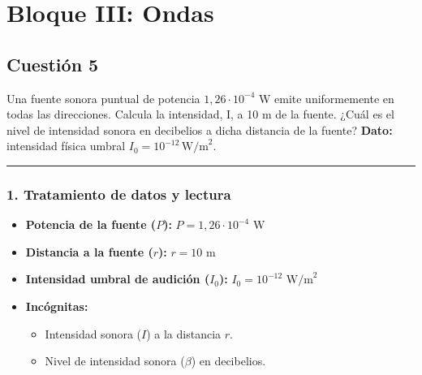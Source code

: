 \newpage

\section{Bloque III: Ondas}
\label{sec:ondas_2022_jun_ord}

\subsection{Cuestión 5}
\label{subsec:C5_2022_jun_ord}

\begin{cajaenunciado}
Una fuente sonora puntual de potencia $1,26 \cdot 10^{-4}$ W emite uniformemente en todas las direcciones. Calcula la intensidad, I, a 10 m de la fuente. ¿Cuál es el nivel de intensidad sonora en decibelios a dicha distancia de la fuente?
\textbf{Dato:} intensidad física umbral $I_0 = 10^{-12} \, \text{W/m}^2$. 
\end{cajaenunciado}
\hrule

\subsubsection*{1. Tratamiento de datos y lectura}
\begin{itemize}
    \item \textbf{Potencia de la fuente ($P$):} $P = 1,26 \cdot 10^{-4} \text{ W}$
    \item \textbf{Distancia a la fuente ($r$):} $r = 10 \text{ m}$
    \item \textbf{Intensidad umbral de audición ($I_0$):} $I_0 = 10^{-12} \text{ W/m}^2$
    \item \textbf{Incógnitas:}
        \begin{itemize}
            \item Intensidad sonora ($I$) a la distancia $r$.
            \item Nivel de intensidad sonora ($\beta$) en decibelios.
        \end{itemize}
\end{itemize}

